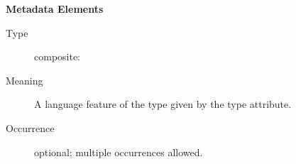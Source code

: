 \documentclass{ivoa}
\begin{document}
\begin{generated}
\begin{bigdescription}
\end{bigdescription}\endgroup



\vspace{0.5ex}\noindent\textbf{ Metadata Elements}

\begingroup\small\begin{bigdescription}\item[Element \xmlel{feature}]
\begin{description}
\item[Type] composite: 
\item[Meaning] A language feature of the type given by the
            type attribute.
\item[Occurrence] optional; multiple occurrences allowed.

\end{description}


\end{bigdescription}\endgroup

\endgroup
\end{generated}

\end{document}
